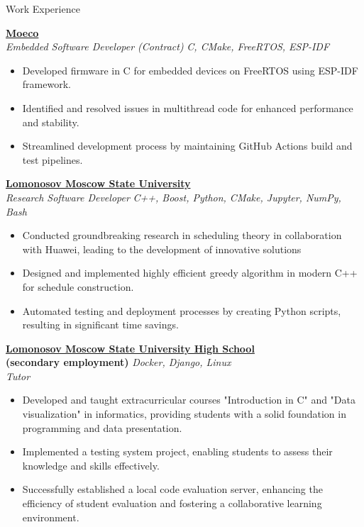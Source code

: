 \documentclass{resume} %
\begin{document}
\begin{rSection}{Work Experience}

{\bf \href{https://www.moeco.io/}{Moeco}} \hfill {} \;  
\\{\textit{ Embedded Software Developer (Contract)}} \hfill {\textit{C, CMake, FreeRTOS, ESP-IDF}}
\begin{itemize}
    \item Developed firmware in C for embedded devices on FreeRTOS using ESP-IDF framework.
    \item Identified and resolved issues in multithread code for enhanced performance and stability.
    \item Streamlined development process by maintaining GitHub Actions build and test pipelines.
\end{itemize}

{\bf \href{https://www.msu.ru/en/index.html}{Lomonosov Moscow State University} } \hfill {} \;  
\\{\textit{ Research Software Developer }} \hfill {\textit{C++, Boost, Python, CMake, Jupyter, NumPy, Bash}}
\begin{itemize}
    \item Conducted groundbreaking research in scheduling theory in collaboration with Huawei, leading to the development of innovative solutions
    \item Designed and implemented highly efficient greedy algorithm in modern C++ for schedule construction.
    \item Automated testing and deployment processes by creating Python scripts, resulting in significant time savings.
\end{itemize}

{\bf \href{https://school.msu.ru/}{Lomonosov Moscow State University High School} } \hfill {} \; 
\\{\bf (secondary employment)} \hfill {\textit{Docker, Django, Linux}}
\\{\textit{ Tutor }}
\begin{itemize}
    \item Developed and taught extracurricular courses "Introduction in C" and "Data visualization" in informatics, providing students with a solid foundation in programming and data presentation.
    \item Implemented a testing system project, enabling students to assess their knowledge and skills effectively.
    \item Successfully established a local code evaluation server, enhancing the efficiency of student evaluation and fostering a collaborative learning environment.
\end{itemize}


\end{rSection}
\end{document}
